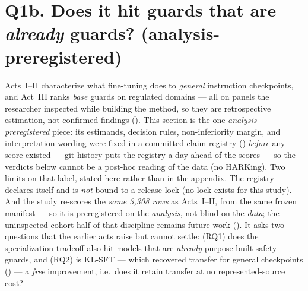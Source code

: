 \section{Q1b. Does it hit guards that are \emph{already} guards? (analysis-preregistered)}
\label{sec:adaptation}

Acts~I--II characterize what fine-tuning does to \emph{general} instruction checkpoints, and Act~III ranks
\emph{base} guards on regulated domains --- all on panels the researcher inspected while building the
method, so they are retrospective estimation, not confirmed findings (). This section is
the one \emph{analysis-preregistered} piece: its estimands, decision rules, non-inferiority margin, and
interpretation wording were fixed in a committed claim registry
() \emph{before} any score
existed --- git history puts the registry a day ahead of the scores --- so the verdicts below cannot be a
post-hoc reading of the data (no HARKing). Two limits on that label, stated here rather than in the
appendix. The registry declares itself  and is \emph{not} bound
to a release lock (no lock exists for this study). And the study re-scores the \emph{same 3{,}308 rows} as
Acts~I--II, from the same frozen manifest --- so it is preregistered on the \emph{analysis}, not blind on
the \emph{data}; the uninspected-cohort half of that discipline remains future work
(). It asks two questions that the earlier acts raise but cannot settle:
(RQ1) does the specialization tradeoff also hit models that are \emph{already} purpose-built safety
guards, and (RQ2) is KL-SFT --- which recovered transfer for general checkpoints ()
--- a \emph{free} improvement, i.e.\ does it retain transfer at no represented-source cost?

